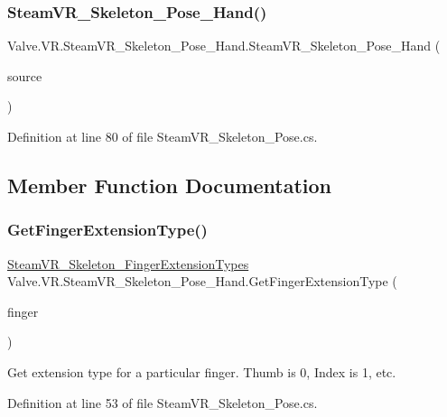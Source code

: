 \subsubsection{\texorpdfstring{SteamVR\_Skeleton\_Pose\_Hand()}{SteamVR\_Skeleton\_Pose\_Hand()}}
{\footnotesize\ttfamily Valve.\+V\+R.\+Steam\+V\+R\+\_\+\+Skeleton\+\_\+\+Pose\+\_\+\+Hand.\+Steam\+V\+R\+\_\+\+Skeleton\+\_\+\+Pose\+\_\+\+Hand (\begin{DoxyParamCaption}\item[{\mbox{\hyperlink{namespace_valve_1_1_v_r_a82e5bf501cc3aa155444ee3f0662853f}{Steam\+V\+R\+\_\+\+Input\+\_\+\+Sources}}}]{source }\end{DoxyParamCaption})}



Definition at line 80 of file Steam\+V\+R\+\_\+\+Skeleton\+\_\+\+Pose.\+cs.



\subsection{Member Function Documentation}
\mbox{\label{class_valve_1_1_v_r_1_1_steam_v_r___skeleton___pose___hand_a78d76c9bae2c0eec3f21b8feb1576d92}} 
\subsubsection{\texorpdfstring{GetFingerExtensionType()}{GetFingerExtensionType()}}
{\footnotesize\ttfamily \mbox{\hyperlink{namespace_valve_1_1_v_r_af4f7ce87893374f71b2fa2ba112642da}{Steam\+V\+R\+\_\+\+Skeleton\+\_\+\+Finger\+Extension\+Types}} Valve.\+V\+R.\+Steam\+V\+R\+\_\+\+Skeleton\+\_\+\+Pose\+\_\+\+Hand.\+Get\+Finger\+Extension\+Type (\begin{DoxyParamCaption}\item[{int}]{finger }\end{DoxyParamCaption})}



Get extension type for a particular finger. Thumb is 0, Index is 1, etc. 



Definition at line 53 of file Steam\+V\+R\+\_\+\+Skeleton\+\_\+\+Pose.\+cs.

